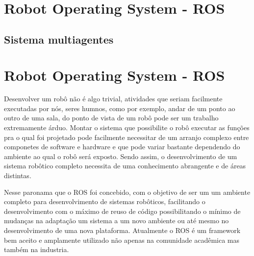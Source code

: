 \chapter{Robot Operating System - ROS}\label{cap:ros}



\section{Sistema multiagentes}





\chapter{Robot Operating System - ROS}\label{cap:ros}

Desenvolver um robô não é algo trivial, atividades que seriam facilmente executadas por nós, 
seres humnos, como por exemplo, andar de um ponto ao outro de uma sala, do ponto de vista de 
um robô pode ser um trabalho extremamente árduo. Montar o sistema que possibilite o robô 
executar as funções pra o qual foi projetado pode facilmente necessitar de um arranjo complexo 
entre componetes de software e hardware e que pode variar bastante dependendo do ambiente ao 
qual o robô será exposto. Sendo assim, o desenvolvimento de um sistema robôtico completo 
necessita de uma conhecimento abrangente e de áreas distintas.  

Nesse paronama que o ROS foi concebido, com o objetivo de  ser um um ambiente completo para 
desenvolvimento de sistemas robôticos, facilitando o desenvolvimento com o máximo de reuso de 
código possibilitando o mínimo de mudanças na adaptação um sistema a um novo ambiente ou até 
mesmo no desenvolvimento de uma nova plataforma. Atualmente o ROS é um framework bem aceito e
amplamente utilizado não apenas na comunidade acadêmica mas também na industria.

